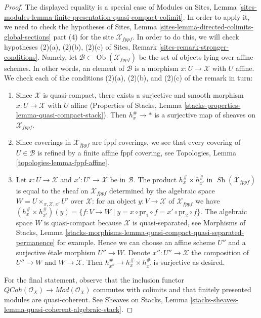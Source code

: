 \documentclass{stacks-project}
\theoremstyle{plain}
\theoremstyle{definition}
\theoremstyle{remark}
\numberwithin{equation}{subsection}
\def\Ob{\mathop{\mathrm{Ob}}\nolimits}
\def\Sh{\mathop{\mathit{Sh}}\nolimits}
\def\QCoh{\mathit{QCoh}}
\begin{document}
\begin{proof}
The displayed equality is a special case of Modules on Sites, Lemma
\ref{sites-modules-lemma-finite-presentation-quasi-compact-colimit}.
In order to apply it, we need to check the hypotheses of
Sites, Lemma \ref{sites-lemma-directed-colimits-global-sections} part (4)
for the site $\mathcal{X}_{fppf}$. In order to do this, we will check
hypotheses (2)(a), (2)(b), (2)(c) of
Sites, Remark \ref{sites-remark-stronger-conditions}.
Namely, let $\mathcal{B} \subset \Ob(\mathcal{X}_{fppf})$ be the set
of objects lying over affine schemes. In other words, an element
of $\mathcal{B}$ is a morphism $x : U \to \mathcal{X}$ with $U$ affine.
We check each of the conditions (2)(a), (2)(b), and (2)(c)
of the remark in turn:
\begin{enumerate}
\item Since $\mathcal{X}$ is quasi-compact, there exists a
surjective and smooth morphism $x : U \to \mathcal{X}$ with $U$ affine
(Properties of Stacks, Lemma
\ref{stacks-properties-lemma-quasi-compact-stack}).
Then $h_x^\# \to *$ is a surjective map of sheaves on $\mathcal{X}_{fppf}$.
\item Since coverings in $\mathcal{X}_{fppf}$ are fppf
coverings, we see that every covering of $U \in \mathcal{B}$ is refined
by a finite affine fppf covering, see
Topologies, Lemma \ref{topologies-lemma-fppf-affine}.
\item Let $x : U \to \mathcal{X}$ and $x' : U' \to \mathcal{X}$ be
in $\mathcal{B}$. The product $h_x^\# \times h_{x'}^\#$ in
$\Sh(\mathcal{X}_{fppf})$ is equal to the sheaf on $\mathcal{X}_{fppf}$
determined by the algebraic space $W = U \times_{x, \mathcal{X}, x'} U'$ over
$\mathcal{X}$: for an object $y : V \to \mathcal{X}$ of
$\mathcal{X}_{fppf}$ we have
$(h_x^\# \times h_{x'}^\#)(y) = \{f : V \to W \mid y =
x \circ \text{pr}_1 \circ f = x' \circ \text{pr}_2 \circ f\}$.
The algebraic space $W$ is quasi-compact because $\mathcal{X}$
is quasi-separated, see Morphisms of Stacks, Lemma
\ref{stacks-morphisms-lemma-quasi-compact-quasi-separated-permanence}
for example. Hence we can choose an affine scheme $U''$ and
a surjective \'etale morphism $U'' \to W$. Denote $x'' : U'' \to \mathcal{X}$
the composition of $U'' \to W$ and $W \to \mathcal{X}$. Then
$h_{x''}^\# \to h_x^\# \times h_{x'}^\#$ is surjective as desired.
\end{enumerate}
For the final statement, observe that the inclusion functor
$\QCoh(\mathcal{O}_X) \to \textit{Mod}(\mathcal{O}_X)$
commutes with colimits and that finitely presented modules
are quasi-coherent. See Sheaves on Stacks, Lemma
\ref{stacks-sheaves-lemma-quasi-coherent-algebraic-stack}.
\end{proof}
\end{document}
